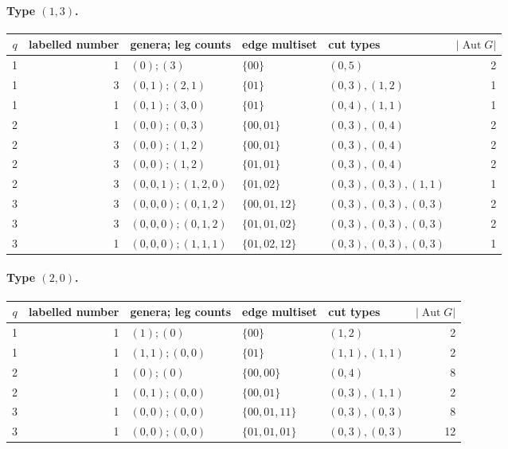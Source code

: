 \paragraph{Type $(1,3)$.}
\begin{longtable}{c|r|l|l|l|r}
$q$ & labelled number & genera; leg counts & edge multiset & cut types & $|\operatorname{Aut}G|$\\\hline
1 & 1 & $(0);(3)$ & $\{00\}$ & $(0,5)$ & 2\\
1 & 3 & $(0,1);(2,1)$ & $\{01\}$ & $(0,3),(1,2)$ & 1\\
1 & 1 & $(0,1);(3,0)$ & $\{01\}$ & $(0,4),(1,1)$ & 1\\
2 & 1 & $(0,0);(0,3)$ & $\{00,01\}$ & $(0,3),(0,4)$ & 2\\
2 & 3 & $(0,0);(1,2)$ & $\{00,01\}$ & $(0,3),(0,4)$ & 2\\
2 & 3 & $(0,0);(1,2)$ & $\{01,01\}$ & $(0,3),(0,4)$ & 2\\
2 & 3 & $(0,0,1);(1,2,0)$ & $\{01,02\}$ & $(0,3),(0,3),(1,1)$ & 1\\
3 & 3 & $(0,0,0);(0,1,2)$ & $\{00,01,12\}$ & $(0,3),(0,3),(0,3)$ & 2\\
3 & 3 & $(0,0,0);(0,1,2)$ & $\{01,01,02\}$ & $(0,3),(0,3),(0,3)$ & 2\\
3 & 1 & $(0,0,0);(1,1,1)$ & $\{01,02,12\}$ & $(0,3),(0,3),(0,3)$ & 1\\
\end{longtable}
\paragraph{Type $(2,0)$.}
\begin{longtable}{c|r|l|l|l|r}
$q$ & labelled number & genera; leg counts & edge multiset & cut types & $|\operatorname{Aut}G|$\\\hline
1 & 1 & $(1);(0)$ & $\{00\}$ & $(1,2)$ & 2\\
1 & 1 & $(1,1);(0,0)$ & $\{01\}$ & $(1,1),(1,1)$ & 2\\
2 & 1 & $(0);(0)$ & $\{00,00\}$ & $(0,4)$ & 8\\
2 & 1 & $(0,1);(0,0)$ & $\{00,01\}$ & $(0,3),(1,1)$ & 2\\
3 & 1 & $(0,0);(0,0)$ & $\{00,01,11\}$ & $(0,3),(0,3)$ & 8\\
3 & 1 & $(0,0);(0,0)$ & $\{01,01,01\}$ & $(0,3),(0,3)$ & 12\\
\end{longtable}
